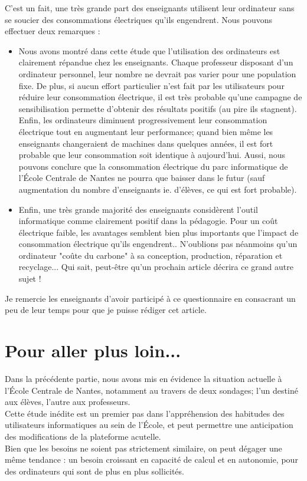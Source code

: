 \documentclass[a4paper,11pt,french]{report}
\begin{document}
C'est un fait, une très grande part des enseignants utilisent leur ordinateur sans se soucier des consommations électriques qu'ils engendrent. Nous pouvons effectuer deux remarques :\\
\begin{itemize}
\item Nous avons montré dans cette étude que l'utilisation des ordinateurs est clairement répandue chez les enseignants. Chaque professeur disposant d'un ordinateur personnel, leur nombre ne devrait pas varier pour une population fixe. De plus, si aucun effort particulier n'est fait par les utilisateurs pour réduire leur consommation électrique, il est très probable qu'une campagne de sensibilisation permette d'obtenir des résultats positifs (au pire ils stagnent). Enfin, les ordinateurs diminuent progressivement leur consommation électrique tout en augmentant leur performance; quand bien même les enseignants changeraient de machines dans quelques années, il est fort probable que leur consommation soit identique à aujourd'hui. Aussi, nous pouvons conclure que la consommation électrique du parc informatique de l'École Centrale de Nantes ne pourra que baisser dans le futur (sauf augmentation du nombre d'enseignants ie. d'élèves, ce qui est fort probable).
\item Enfin, une très grande majorité des enseignants considèrent l'outil informatique comme clairement positif dans la pédagogie. Pour un coût électrique faible, les avantages semblent bien plus importants que l'impact de consommation électrique qu'ils engendrent.. N'oublions pas néanmoins qu'un ordinateur "coûte du carbone" à sa conception, production, réparation et recyclage... Qui sait, peut-être qu'un prochain article décrira ce grand autre sujet !
\end{itemize}

Je remercie les enseignants d'avoir participé à ce questionnaire en consacrant un peu de leur temps pour que je puisse rédiger cet article.


\newpage
\chapter{Pour aller plus loin...}
Dans la précédente partie, nous avons mis en évidence la situation actuelle à l'\'Ecole Centrale de Nantes, notamment au travers de deux sondages; l'un destiné aux élèves, l'autre aux professeurs.\\
Cette étude inédite est un premier pas dans l'appréhension des habitudes des utilisateurs informatiques au sein de l'\'Ecole, et peut permettre une anticipation des modifications de la plateforme acutelle.\\
Bien que les besoins ne soient pas strictement similaire, on peut dégager une même tendance : un besoin croissant en capacité de calcul et en autonomie, pour des ordinateurs qui sont de plus en plus sollicités.\\
\end{document}
